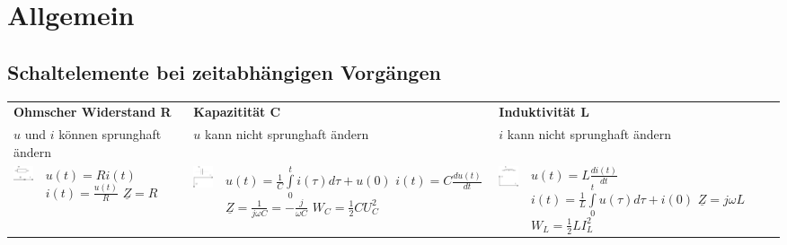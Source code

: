 
\section{Allgemein}
	\subsection{Schaltelemente bei zeitabhängigen Vorgängen}
	\begin{tabular}{p{1.5cm} p{4.3cm} p{1.5cm} p{4.3cm} p{1.5cm} p{4.3cm}}
   		\multicolumn{2}{l}{\textbf{Ohmscher Widerstand R}}
   			& \multicolumn{2}{l}{\textbf{Kapazitität C}}
   			& \multicolumn{2}{l}{\textbf{Induktivität L}} \\
   		\multicolumn{2}{l}{$u$ und $i$ können sprunghaft ändern}
   			& \multicolumn{2}{l}{$u$ kann nicht sprunghaft ändern}
   			& \multicolumn{2}{l}{$i$ kann nicht sprunghaft ändern} \\
   		\parbox{1.5cm}{
			\includegraphics[width=1.5cm]{./bilder/zeigerdiag-r.png}}
			& \parbox{4.3cm}{$u(t) = R i(t)$ \\
				$i(t) = \frac{u(t)}{R}$ \\
				$\underline{Z} = R$}
   			& \parbox{1.5cm}{
				\includegraphics[width=1.5cm]{./bilder/zeigerdiag-c.png}}
			& \parbox{4.3cm}{
				$u(t) = \frac1C \int\limits_0^t i(\tau) d\tau + u(0)$ \\
				$i(t) = C \frac{d u(t)}{dt}$ \\
				$\underline{Z} = \frac{1}{j \omega C} = - \frac{j}{\omega C}$ \\
				$W_C=\frac12 C U_C^2$}
   			& \parbox{1.5cm}{
				\includegraphics[width=1.5cm]{./bilder/zeigerdiag-l.png}}
			& \parbox{4.3cm}{
				$u(t) = L \frac{di(t)}{dt}$ \\
				$i(t) = \frac1L \int\limits_0^t u(\tau) d\tau + i(0)$ \\
				$\underline{Z} = j \omega L$ \\
				$W_L=\frac12 L I_L^2$}
   	\end{tabular}


